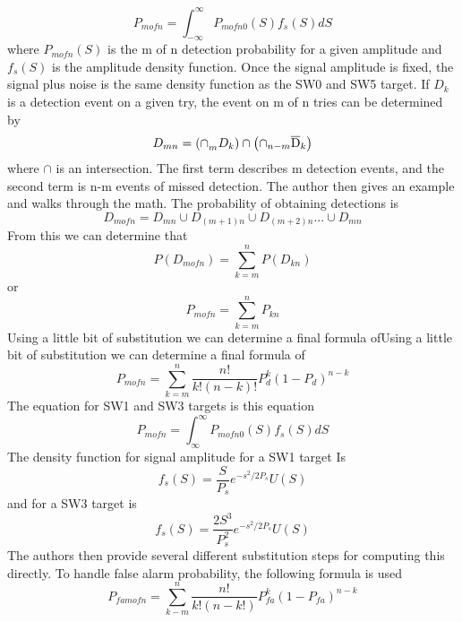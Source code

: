 \documentclass[12pt]{article}
\begin{document}
\begin{equation}
    P_{mofn} = \int_{-\infty}^{\infty} P_{mofn0} (S) f_s (S) dS
\end{equation}
where $P_{mofn}(S)$ is the m of n detection probability for a given amplitude and $f_s(S)$ is the amplitude density function. Once the signal amplitude is fixed, the signal plus noise is the same density function as the SW0 and SW5 target. If $D_k$ is a detection event on a given try, the event on m of n tries can be determined by 
\begin{equation}
    D_{mn} = \left( \cap_{m}^{} D_k \right) \cap \left(  \cap_{n-m} \overline{\rm D}_k\right)
\end{equation}
where $\cap$ is an intersection. The first term describes m detection events, and the second term is n-m events of missed detection. The author then gives an example and walks through the math. The probability of obtaining detections is 
\begin{equation}
    D_{mofn} = D_{mn} \cup D_{(m+1)n} \cup D_{(m+2)n} ... \cup D_{mn}
\end{equation}
From this we can determine that
\begin{equation}
    P(D_{mofn}) = \sum_{k=m}^{n} P(D_{kn})
\end{equation}
or 
\begin{equation}
    P_{mofn} = \sum_{k=m}^{n} P_{kn}
\end{equation}
Using a little bit of substitution we can determine a final formula ofUsing a little bit of substitution we can determine a final formula of
\begin{equation}
    P_{mofn} = \sum_{k=m}^{n} \frac{n!}{k!(n-k)!} P_d^k (1-P_d)^{n-k}
\end{equation}
The equation for SW1 and SW3 targets is this equation
\begin{equation}
    P_{mofn} = \int_{\infty}^{\infty} P_{mofn0} (S) f_s (S) dS
\end{equation}
The density function for signal amplitude for a SW1 target Is
\begin{equation}
    f_s(S) = \frac{S}{P_s}e^{-s^2/2P_s} U(S)
\end{equation}
and for a SW3 target is
\begin{equation}
    f_s(S) = \frac{2S^3}{P^2_s}e^{-s^2/2P_s} U(S)
\end{equation}
The authors then provide several different substitution steps for computing this directly. To handle false alarm probability, the following formula is used
\begin{equation}
    P_{famofn} = \sum_{k-m}^{n} \frac{n!}{k!(n-k!)} P_{fa}^k (1-P_{fa})^{n-k}
\end{equation}
\end{document}
